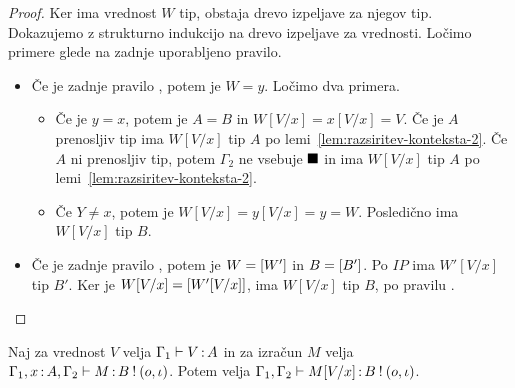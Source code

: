 \begin{proof}
	Ker ima vrednost $W$ tip, obstaja drevo izpeljave za njegov tip.
	Dokazujemo z strukturno indukcijo na drevo izpeljave za vrednosti.
	Ločimo primere glede na zadnje uporabljeno pravilo.
	
	\begin{itemize}
		\item Če je zadnje pravilo , potem je $W = y$.
		Ločimo dva primera.
		\begin{itemize}
			\item Če je $y = x$, potem je $A = B$ in $W[V/x] = x[V/x] = V$. Če je $A$ prenosljiv tip ima $W[V/x]$ tip $A$ po lemi~\ref{lem:razsiritev-konteksta-2}. Če $A$ ni prenosljiv tip, potem $\Gamma_2$ ne vsebuje $\blacksquare$ in ima $W[V/x]$ tip $A$ po lemi~\ref{lem:razsiritev-konteksta-2}.
			
			\item Če $Y \neq x$, potem je $W[V/x] = y[V/x] = y = W$. Posledično ima $W[V/x]$ tip $B$.
		\end{itemize}
		
		\item Če je zadnje pravilo , potem je $W=[W']$ in $B=[B']$. Po $IP$ ima $W'[V/x]$ tip $B'$. Ker je $W[V/x] = [W'[V/x]]$, ima $W[V/x]$ tip $B$, po pravilu .
		
	\end{itemize}
\end{proof}

\begin{lema}\label{lem:substitucija-izračuni-2}
	Naj za vrednost $V$ velja $\Gamma_1 \vdash V \mathinner{:} A$ in za izračun $M$ velja $\Gamma_1, x \mathinner{:} A, \Gamma_2 \vdash M \mathinner{:} B \mathbin{!} (o, \iota)$. Potem velja $\Gamma_1, \Gamma_2 \vdash M[V/x] \mathinner{:} B \mathbin{!} (o, \iota)$.
\end{lema}

